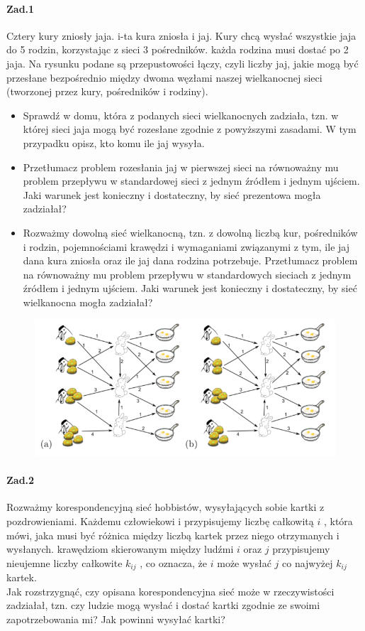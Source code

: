 \documentclass[a4paper,12pt]{article}
\theoremstyle{definition}%
\theoremstyle{definition}
\theoremstyle{problem}
\begin{document}
\paragraph{Zad.1} Cztery kury zniosły jaja. i-ta kura zniosła i jaj. Kury chcą wysłać wszystkie jaja do 5 rodzin, korzystając z sieci 3 pośredników. każda rodzina musi dostać po 2 jaja. Na rysunku podane są przepustowości łączy, czyli liczby jaj, jakie mogą być przesłane bezpośrednio między dwoma węzłami naszej wielkanocnej sieci (tworzonej przez kury, pośredników i rodziny). 
\begin{itemize}
\item Sprawdź w domu, która z podanych sieci wielkanocnych zadziała, tzn. w której sieci jaja mogą być rozesłane zgodnie z powyższymi zasadami. W tym przypadku opisz, kto komu ile jaj wysyła.
\item Przetłumacz problem rozesłania jaj w pierwszej sieci na równoważny mu problem przepływu w standardowej sieci z jednym źródłem i jednym ujściem. Jaki warunek jest konieczny i dostateczny, by sieć prezentowa mogła zadziałał?
\item Rozważmy dowolną sieć wielkanocną, tzn. z dowolną liczbą kur, pośredników i rodzin, pojemnościami krawędzi i wymaganiami związanymi z tym, ile jaj dana kura zniosła oraz ile jaj dana rodzina potrzebuje. Przetłumacz problem na równoważny mu problem przepływu w standardowych sieciach z jednym źródłem i jednym ujściem. Jaki warunek jest konieczny i dostateczny, by sieć wielkanocna mogła zadziałał?
\end{itemize}
\begin{figure}
\centering
\includegraphics[width=.8\textwidth]{img/7_Z1}
\end{figure}


\paragraph{Zad.2} Rozważmy korespondencyjną sieć hobbistów, wysyłających sobie kartki z pozdrowieniami. Każdemu człowiekowi i przypisujemy liczbę całkowitą $i$ , która mówi, jaka musi być różnica między liczbą kartek przez niego otrzymanych i wysłanych. krawędziom skierowanym między ludźmi $i$ oraz $j$ przypisujemy nieujemne liczby całkowite $k_{ij}$ , co oznacza, że $i$ może wysłać $j$ co najwyżej $k_{ij}$ kartek.\\
Jak rozstrzygnąć, czy opisana korespondencyjna sieć może w rzeczywistości zadziałał, tzn. czy ludzie mogą wysłać i dostać kartki zgodnie ze swoimi zapotrzebowania mi? Jak powinni wysyłać kartki?
\end{document}
